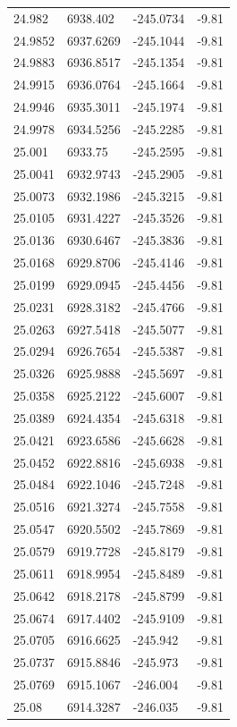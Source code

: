 \begin{table}[H]
\begin{tabular}{llll}
24.982 & 6938.402 & -245.0734 & -9.81 \\
24.9852 & 6937.6269 & -245.1044 & -9.81 \\
24.9883 & 6936.8517 & -245.1354 & -9.81 \\
24.9915 & 6936.0764 & -245.1664 & -9.81 \\
24.9946 & 6935.3011 & -245.1974 & -9.81 \\
24.9978 & 6934.5256 & -245.2285 & -9.81 \\
25.001 & 6933.75 & -245.2595 & -9.81 \\
25.0041 & 6932.9743 & -245.2905 & -9.81 \\
25.0073 & 6932.1986 & -245.3215 & -9.81 \\
25.0105 & 6931.4227 & -245.3526 & -9.81 \\
25.0136 & 6930.6467 & -245.3836 & -9.81 \\
25.0168 & 6929.8706 & -245.4146 & -9.81 \\
25.0199 & 6929.0945 & -245.4456 & -9.81 \\
25.0231 & 6928.3182 & -245.4766 & -9.81 \\
25.0263 & 6927.5418 & -245.5077 & -9.81 \\
25.0294 & 6926.7654 & -245.5387 & -9.81 \\
25.0326 & 6925.9888 & -245.5697 & -9.81 \\
25.0358 & 6925.2122 & -245.6007 & -9.81 \\
25.0389 & 6924.4354 & -245.6318 & -9.81 \\
25.0421 & 6923.6586 & -245.6628 & -9.81 \\
25.0452 & 6922.8816 & -245.6938 & -9.81 \\
25.0484 & 6922.1046 & -245.7248 & -9.81 \\
25.0516 & 6921.3274 & -245.7558 & -9.81 \\
25.0547 & 6920.5502 & -245.7869 & -9.81 \\
25.0579 & 6919.7728 & -245.8179 & -9.81 \\
25.0611 & 6918.9954 & -245.8489 & -9.81 \\
25.0642 & 6918.2178 & -245.8799 & -9.81 \\
25.0674 & 6917.4402 & -245.9109 & -9.81 \\
25.0705 & 6916.6625 & -245.942 & -9.81 \\
25.0737 & 6915.8846 & -245.973 & -9.81 \\
25.0769 & 6915.1067 & -246.004 & -9.81 \\
25.08 & 6914.3287 & -246.035 & -9.81 \\

\end{tabular}
\end{table}
